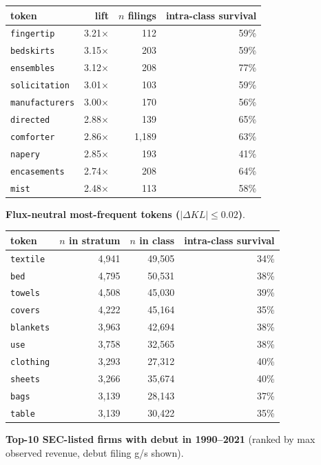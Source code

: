 \begin{tabular}{lrrr}
\toprule
token & lift & $n$ filings & intra-class survival \\
\midrule
\texttt{fingertip} & 3.21$\times$ & 112 & 59\% \\
\texttt{bedskirts} & 3.15$\times$ & 203 & 59\% \\
\texttt{ensembles} & 3.12$\times$ & 208 & 77\% \\
\texttt{solicitation} & 3.01$\times$ & 103 & 59\% \\
\texttt{manufacturers} & 3.00$\times$ & 170 & 56\% \\
\texttt{directed} & 2.88$\times$ & 139 & 65\% \\
\texttt{comforter} & 2.86$\times$ & 1,189 & 63\% \\
\texttt{napery} & 2.85$\times$ & 193 & 41\% \\
\texttt{encasements} & 2.74$\times$ & 208 & 64\% \\
\texttt{mist} & 2.48$\times$ & 113 & 58\% \\
\bottomrule
\end{tabular}

\textbf{Flux-neutral most-frequent tokens ($|\Delta KL|\leq 0.02$)}.

\begin{tabular}{lrrr}
\toprule
token & $n$ in stratum & $n$ in class & intra-class survival \\
\midrule
\texttt{textile} & 4,941 & 49,505 & 34\% \\
\texttt{bed} & 4,795 & 50,531 & 38\% \\
\texttt{towels} & 4,508 & 45,030 & 39\% \\
\texttt{covers} & 4,222 & 45,164 & 35\% \\
\texttt{blankets} & 3,963 & 42,694 & 38\% \\
\texttt{use} & 3,758 & 32,565 & 38\% \\
\texttt{clothing} & 3,293 & 27,312 & 40\% \\
\texttt{sheets} & 3,266 & 35,674 & 40\% \\
\texttt{bags} & 3,139 & 28,143 & 37\% \\
\texttt{table} & 3,139 & 30,422 & 35\% \\
\bottomrule
\end{tabular}

\textbf{Top-10 SEC-listed firms with debut in 1990--2021} (ranked by max observed revenue, debut filing g/s shown).


